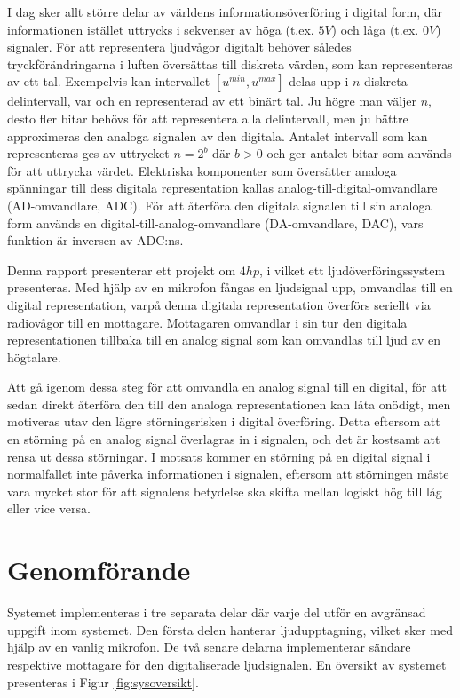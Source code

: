 \documentclass[a4paper,10pt]{article}
\begin{document}
I dag sker allt större delar av världens informationsöverföring i digital form, 
där informationen istället uttrycks i sekvenser av höga (t.ex. $5V$) och låga
(t.ex. $0V$) signaler. För att representera ljudvågor digitalt behöver således 
tryckförändringarna i luften översättas till diskreta värden, som kan 
representeras av ett tal.
Exempelvis kan intervallet $[u^{min}, u^{max}]$ delas upp i $n$ diskreta 
delintervall, var och en representerad av ett binärt tal. Ju högre man väljer
$n$, desto fler bitar behövs för att representera alla delintervall, men ju
bättre approximeras den analoga signalen av den digitala. Antalet intervall som 
kan representeras ges av uttrycket $n = 2^b$ där $b > 0$ och ger antalet bitar 
som används för att uttrycka värdet. Elektriska komponenter som översätter 
analoga spänningar till dess digitala representation kallas 
analog-till-digital-omvandlare (AD-omvandlare, ADC). 
För att återföra den digitala signalen till sin analoga form används en
digital-till-analog-omvandlare (DA-omvandlare, DAC), vars funktion är
inversen av ADC:ns. 

Denna rapport presenterar ett projekt om $4 hp$, i vilket ett 
ljudöverföringssystem presenteras. Med hjälp av en mikrofon fångas en 
ljudsignal upp, omvandlas till en digital representation, varpå denna digitala 
representation överförs seriellt via radiovågor till en mottagare. Mottagaren 
omvandlar i sin tur den digitala representationen tillbaka till en analog signal 
som kan omvandlas till ljud av en högtalare.

Att gå igenom dessa steg för att omvandla en analog signal till en digital, för
att sedan direkt återföra den till den analoga representationen kan låta 
onödigt, men motiveras utav den lägre störningsrisken i digital överföring. 
Detta eftersom att en störning på en analog signal överlagras in i signalen, och
det är kostsamt att rensa ut dessa störningar. I motsats kommer en störning på
en digital signal i normalfallet inte påverka informationen i signalen, eftersom
att störningen måste vara mycket stor för att signalens betydelse ska skifta
mellan logiskt hög till låg eller vice versa.


\section{Genomförande}

Systemet implementeras i tre separata delar där varje del utför en avgränsad 
uppgift inom systemet. Den första delen hanterar ljudupptagning, vilket sker med
hjälp av en vanlig mikrofon. De två senare delarna implementerar sändare
respektive mottagare för den digitaliserade ljudsignalen. En översikt av 
systemet presenteras i Figur \ref{fig:sysoversikt}.
\end{document}
